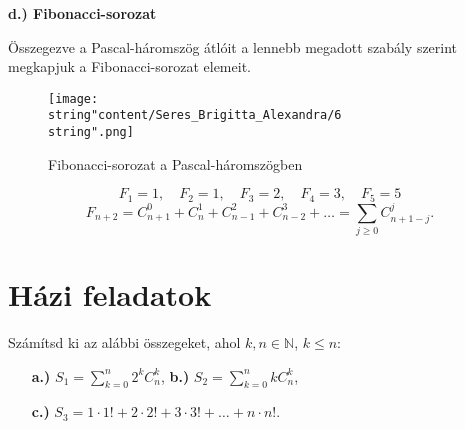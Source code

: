 \textbf{d.) Fibonacci-sorozat}

Összegezve a Pascal-háromszög átlóit a lennebb megadott szabály szerint
megkapjuk a Fibonacci-sorozat elemeit. 
\begin{figure}[h]
\centering \texttt{[image: \\string"content/Seres\_Brigitta\_Alexandra/6\\string".png]}
\caption{Fibonacci-sorozat a Pascal-háromszögben}
\label{7sb5} 
\end{figure}

\[
F_{1}=1,\quad F_{2}=1,\quad F_{3}=2,\quad F_{4}=3,\quad F_{5}=5
\]
\[
F_{n+2}=C_{n+1}^{0}+C_{n}^{1}+C_{n-1}^{2}+C_{n-2}^{3}+\ldots=\sum_{j\geq0}C_{n+1-j}^{j}.
\]


\section*{Házi feladatok}
\begin{problem}
Számítsd ki az alábbi összegeket, ahol $k,n\in\mathbb{N}$, $k\leq n$:
\begin{enumerate}
\item[{\small\textbf{a.)}}] ${\displaystyle S_{1}=\sum_{k=0}^{n}2^{k}C_{n}^{k}}$, \quad{}\quad{}\textbf{b.)}
${\displaystyle S_{2}=\sum_{k=0}^{n}kC_{n}^{k}}$,
\item[{\small\textbf{c.)}}] ${\displaystyle S_{3}=1\cdot1!+2\cdot2!+3\cdot3!+\ldots+n\cdot n!.}$ 
\end{enumerate}
\end{problem}

